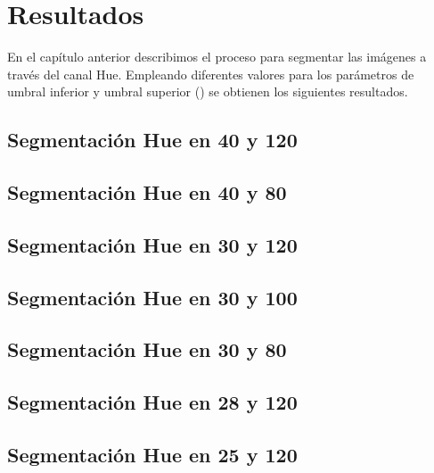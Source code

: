 \chapter{Resultados}
En el capítulo anterior describimos el proceso para segmentar las imágenes a través del canal Hue. Empleando diferentes valores para los parámetros de umbral inferior y umbral superior () se obtienen los siguientes resultados.

\section{Segmentación Hue en 40 y 120}


\section{Segmentación Hue en 40 y 80}


\section{Segmentación Hue en 30 y 120}


\section{Segmentación Hue en 30 y 100}


\section{Segmentación Hue en 30 y 80}


\section{Segmentación Hue en 28 y 120}


\section{Segmentación Hue en 25 y 120}
